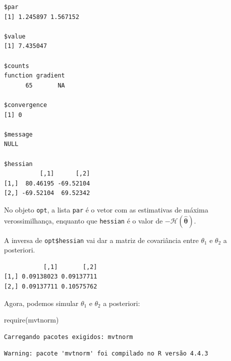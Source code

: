 \documentclass[
  letterpaper,
  DIV=11,
  numbers=noendperiod]{scrreprt}
\newenvironment{Shaded}{\begin{snugshade}}{\end{snugshade}}
\newcommand{\DecValTok}[1]{\textcolor[rgb]{0.68,0.00,0.00}{#1}}
\newcommand{\FunctionTok}[1]{\textcolor[rgb]{0.28,0.35,0.67}{#1}}
\newcommand{\NormalTok}[1]{\textcolor[rgb]{0.00,0.23,0.31}{#1}}
\newcommand{\OtherTok}[1]{\textcolor[rgb]{0.00,0.23,0.31}{#1}}
\newcommand{\SpecialCharTok}[1]{\textcolor[rgb]{0.37,0.37,0.37}{#1}}
\theoremstyle{definition}
\theoremstyle{definition}
\theoremstyle{plain}
\theoremstyle{remark}
\begin{document}
\begin{verbatim}
$par
[1] 1.245897 1.567152

$value
[1] 7.435047

$counts
function gradient 
      65       NA 

$convergence
[1] 0

$message
NULL

$hessian
          [,1]      [,2]
[1,]  80.46195 -69.52104
[2,] -69.52104  69.52342
\end{verbatim}

No objeto \texttt{opt}, a lista \texttt{par} é o vetor com as
estimativas de máxima verossimilhança, enquanto que \texttt{hessian} é o
valor de \(-\mathcal{H}(\hat{\boldsymbol{\theta}})\).

A inversa de \texttt{opt\$hessian} vai dar a matriz de covariância entre
\(\theta_1\) e \(\theta_2\) a posteriori.

\begin{Shaded}
\end{Shaded}

\begin{verbatim}
           [,1]       [,2]
[1,] 0.09138023 0.09137711
[2,] 0.09137711 0.10575762
\end{verbatim}

Agora, podemos simular \(\theta_1\) e \(\theta_2\) a posteriori:

\begin{Shaded}
\begin{Highlighting}[]
\FunctionTok{require}\NormalTok{(mvtnorm)}
\end{Highlighting}
\end{Shaded}

\begin{verbatim}
Carregando pacotes exigidos: mvtnorm
\end{verbatim}

\begin{verbatim}
Warning: pacote 'mvtnorm' foi compilado no R versão 4.4.3
\end{verbatim}

\begin{Shaded}
\end{Shaded}
\end{document}

